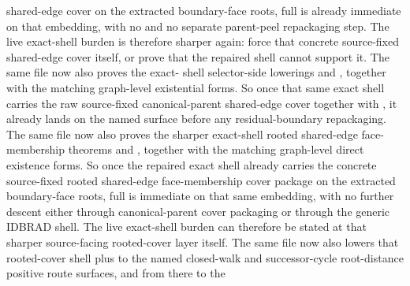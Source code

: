 \documentclass[11pt]{article}
\begin{document}
\begin{itemize}
shared-edge cover on the extracted boundary-face roots, full
 is already immediate on that embedding,
with no  and no separate parent-peel
repackaging step.  The live exact-shell burden is therefore sharper again:
force that concrete source-fixed shared-edge cover itself, or prove that the
repaired shell cannot support it.  The same file now also proves the exact-
shell selector-side lowerings
and
,
together with the matching graph-level existential forms.  So once that same
exact shell carries the raw source-fixed canonical-parent shared-edge cover
together with , it already lands on the
named  surface before
any residual-boundary repackaging.  The same file now also proves the sharper
exact-shell rooted shared-edge face-membership theorems
and
,
together with the matching graph-level direct existence forms.  So once the
repaired exact shell already carries the concrete source-fixed rooted
shared-edge face-membership cover package on the extracted boundary-face
roots, full  is immediate on that same
embedding, with no further descent either through canonical-parent cover
packaging or through the generic IDBRAD shell.  The live exact-shell burden
can therefore be stated at that sharper source-facing rooted-cover layer
itself.  The same file now also lowers that rooted-cover shell plus
 to the named closed-walk and
successor-cycle root-distance positive route surfaces, and from there to the

\end{itemize}
\end{document}
